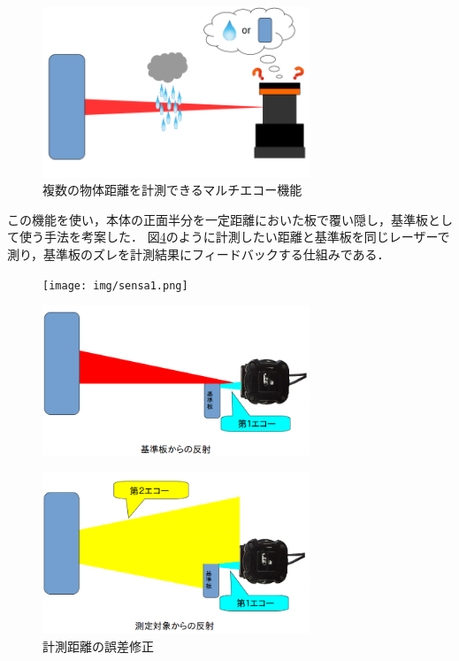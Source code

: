 \documentclass[12pt,oneside]{sotsuken_paper}
\begin{document}
\begin{figure}[H]
\begin{center}
\includegraphics[width=80mm]{img/marutieko2.png}
\end{center}
\caption{複数の物体距離を計測できるマルチエコー機能}
\label{fig:marutieko2}
\end{figure}

この機能を使い，本体の正面半分を一定距離においた板で覆い隠し，基準板として使う手法を考案した．
図\ref{fig:sensa3}のように計測したい距離と基準板を同じレーザーで測り，基準板のズレを計測結果にフィードバックする仕組みである．

\begin{figure}[H]
\begin{center}
\texttt{[image: img/sensa1.png]}
\end{center}
\label{fig:sensa1}
\end{figure}

\begin{figure}[H]
\begin{center}
\includegraphics[width=80mm]{img/sensa2.png}
\end{center}
\label{fig:sensa2}
\end{figure}

\begin{figure}[H]
\begin{center}
\includegraphics[width=80mm]{img/sensa3.png}
\end{center}
\caption{計測距離の誤差修正}
\label{fig:sensa3}
\end{figure}
\end{document}
